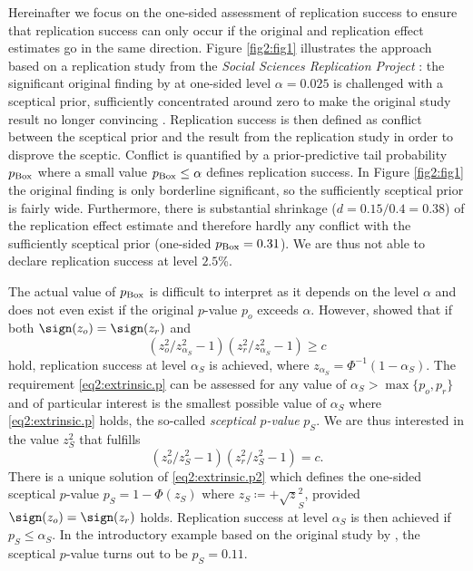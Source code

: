 Hereinafter we focus on the one-sided assessment of replication success to
ensure that replication success can only occur if the original and replication
effect estimates go in the same direction. Figure \ref{fig2:fig1} illustrates the
\citet{Held2020} approach based on a replication study from the \textit{Social
  Sciences Replication Project} \citep{Camerer2018}: the significant original
finding by \citet{Pyc2010} at one-sided level $\alpha=0.025$ is challenged with
a sceptical prior, sufficiently concentrated around zero to make the original
study result no longer convincing \citep{Matthews2001a,Matthews2001b}.
Replication success is then defined as conflict between the sceptical prior and
the result from the replication study in order to disprove the sceptic. Conflict
is quantified by a prior-predictive tail probability $p_{\mbox{\scriptsize
    Box}}$ \citep{Box1980} where a small value $p_{\mbox{\scriptsize
    Box}} \leq \alpha$ defines replication success. In Figure \ref{fig2:fig1} the
original finding is only borderline significant, so the sufficiently sceptical
prior is fairly wide. Furthermore, there is substantial shrinkage
($d = 0.15/0.4 = 0.38$) of the replication effect estimate and therefore hardly
any conflict with the sufficiently sceptical prior (one-sided
$p_{\mbox{\scriptsize Box}}=0.31$). We are thus not able to declare replication
success at level $2.5$\%.

The actual value of $p_{\mbox{\scriptsize Box}}$ is difficult to interpret as it
depends on the level $\alpha$ and does not even exist if the original $p$-value
$p_o$ exceeds $\alpha$. However, \citet{Held2020} showed that if both
$\sign(z_o)=\sign(z_r)$ and
\begin{equation}\label{eq2:extrinsic.p}
\left({z_o^2}/{z_{{\alpha_S}}^2}-1 \right) \left({z_r^2}/{z_{{\alpha_S}}^2}
- 1 \right) \geq c
\end{equation}
hold, replication success at level ${\alpha_S}$ is achieved, where
$z_{{\alpha_S}} = \Phi^{-1}(1-{\alpha_S})$. The requirement
\eqref{eq2:extrinsic.p} can be assessed for any value of
${{\alpha_S}} > \max\{p_o, p_r\}$ and of particular interest is the smallest
possible value of $\alpha_S$ where \eqref{eq2:extrinsic.p} holds, the so-called
\textit{sceptical $p$-value} $p_S$. We are thus interested in the value $z_S^2$
that fulfills
\begin{equation}\label{eq2:extrinsic.p2}
\left({z_o^2}/{z_{S}^2}-1 \right) \left({z_r^2}/{z_{S}^2}
- 1 \right) = c.
\end{equation}
There is a unique solution of \eqref{eq2:extrinsic.p2} which defines the
one-sided {sceptical $p$-value} $p_S= 1-\Phi\left({z_S}\right)$ where
$z_{S} \coloneqq + \surd z_{S}^2$, provided $\sign(z_o)=\sign(z_r)$ holds.
Replication success at level $\alpha_S$ is then achieved if $p_S \leq \alpha_S$.
In the introductory example based on the original study by \citet{Pyc2010}, the
sceptical $p$-value turns out to be $p_S=0.11$.


